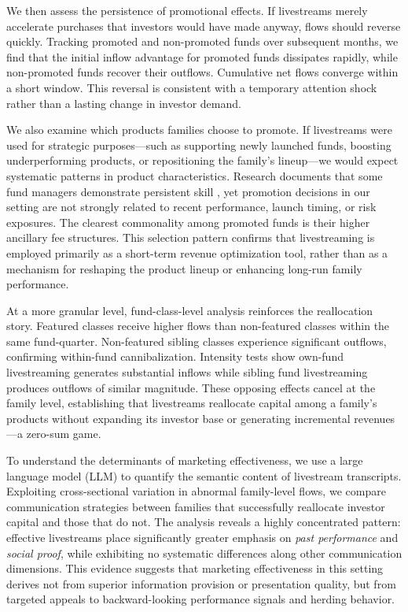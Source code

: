 \documentclass[12pt]{article}
\begin{document}
We then assess the persistence of promotional effects. If livestreams merely accelerate purchases that investors would have made anyway, flows should reverse quickly. Tracking promoted and non-promoted funds over subsequent months, we find that the initial inflow advantage for promoted funds dissipates rapidly, while non-promoted funds recover their outflows. Cumulative net flows converge within a short window. This reversal is consistent with a temporary attention shock rather than a lasting change in investor demand.

We also examine which products families choose to promote. If livestreams were used for strategic purposes—such as supporting newly launched funds, boosting underperforming products, or repositioning the family's lineup—we would expect systematic patterns in product characteristics. Research documents that some fund managers demonstrate persistent skill \citep{berk2015measuring}, yet promotion decisions in our setting are not strongly related to recent performance, launch timing, or risk exposures. The clearest commonality among promoted funds is their higher ancillary fee structures. This selection pattern confirms that livestreaming is employed primarily as a short-term revenue optimization tool, rather than as a mechanism for reshaping the product lineup or enhancing long-run family performance.

At a more granular level, fund-class-level analysis reinforces the reallocation story. Featured classes receive higher flows than non-featured classes within the same fund-quarter. Non-featured sibling classes experience significant outflows, confirming within-fund cannibalization. Intensity tests show own-fund livestreaming generates substantial inflows while sibling fund livestreaming produces outflows of similar magnitude. These opposing effects cancel at the family level, establishing that livestreams reallocate capital among a family's products without expanding its investor base or generating incremental revenues—a zero-sum game.

To understand the determinants of marketing effectiveness, we use a large language model (LLM) to quantify the semantic content of livestream transcripts. Exploiting cross-sectional variation in abnormal family-level flows, we compare communication strategies between families that successfully reallocate investor capital and those that do not. The analysis reveals a highly concentrated pattern: effective livestreams place significantly greater emphasis on \textit{past performance} and \textit{social proof}, while exhibiting no systematic differences along other communication dimensions. This evidence suggests that marketing effectiveness in this setting derives not from superior information provision or presentation quality, but from targeted appeals to backward-looking performance signals and herding behavior.
\end{document}
